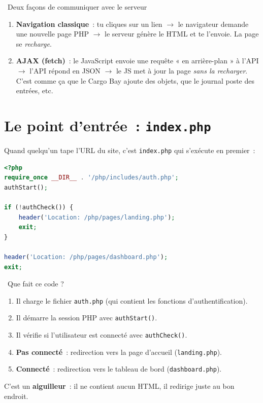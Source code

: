 \documentclass[12pt,a4paper]{article}
\begin{document}
\begin{tipbox}{\faLightbulb\ Deux façons de communiquer avec le serveur}
\begin{enumerate}
    \item \textbf{Navigation classique}~: tu cliques sur un lien $\to$ le navigateur demande une nouvelle page PHP $\to$ le serveur génère le HTML et te l'envoie. La page se \textit{recharge}.
    \item \textbf{AJAX (fetch)}~: le JavaScript envoie une requête « en arrière-plan » à l'API $\to$ l'API répond en JSON $\to$ le JS met à jour la page \textit{sans la recharger}. C'est comme ça que le Cargo Bay ajoute des objets, que le journal poste des entrées, etc.
\end{enumerate}
\end{tipbox}

\section{Le point d'entrée~: \texttt{index.php}}

Quand quelqu'un tape l'URL du site, c'est \texttt{index.php} qui s'exécute en premier~:

\begin{lstlisting}[language=PHP, title={\texttt{index.php}}]
<?php
require_once __DIR__ . '/php/includes/auth.php';
authStart();

if (!authCheck()) {
    header('Location: /php/pages/landing.php');
    exit;
}

header('Location: /php/pages/dashboard.php');
exit;
\end{lstlisting}

\begin{conceptbox}{\faRoute\ Que fait ce code ?}
\begin{enumerate}
    \item Il charge le fichier \texttt{auth.php} (qui contient les fonctions d'authentification).
    \item Il démarre la session PHP avec \texttt{authStart()}.
    \item Il vérifie si l'utilisateur est connecté avec \texttt{authCheck()}.
    \item \textbf{Pas connecté}~: redirection vers la page d'accueil (\texttt{landing.php}).
    \item \textbf{Connecté}~: redirection vers le tableau de bord (\texttt{dashboard.php}).
\end{enumerate}
C'est un \textbf{aiguilleur}~: il ne contient aucun HTML, il redirige juste au bon endroit.
\end{conceptbox}
\end{document}
